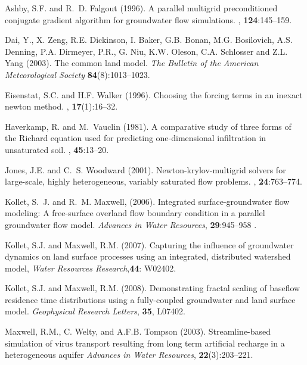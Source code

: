 \begin{thebibliography}{99}

Ashby, S.F. and R.~D. Falgout (1996).
\newblock A parallel multigrid preconditioned conjugate gradient algorithm for
  groundwater flow simulations.
, {\bf 124}:145--159.

Dai, Y., X. Zeng, R.E. Dickinson, I. Baker, G.B. Bonan, M.G. Bosilovich, A.S. Denning, P.A. Dirmeyer, P.R., G. Niu, K.W. Oleson, C.A. Schlosser and Z.L. Yang (2003). The common land model. {\em The Bulletin of the American Meteorological Society} {\bf 84}(8):1013--1023.

Eisenstat, S.C. and H.F. Walker (1996).
\newblock Choosing the forcing terms in an inexact newton method.
, {\bf 17}(1):16--32.

Haverkamp, R. and M.~Vauclin (1981).
\newblock A comparative study of three forms of the {R}ichard equation used for
  predicting one-dimensional infiltration in unsaturated soil.
, {\bf 45}:13--20.


Jones, J.E. and C.~S. Woodward (2001).
\newblock Newton-krylov-multigrid solvers for large-scale, highly heterogeneous, variably saturated flow problems.
, {\bf 24}:763--774.

Kollet, S.~J. and R.~M. Maxwell, (2006). Integrated
surface-groundwater flow
  modeling: A free-surface overland flow boundary condition in a parallel
  groundwater flow model. {\em Advances in Water Resources}, {\bf 29}:945--958 .

Kollet, S.J. and Maxwell, R.M. (2007). Capturing the influence of groundwater dynamics on land surface processes using an integrated, distributed watershed model, { \em Water Resources Research},{\bf 44}: W02402.

Kollet, S.J. and Maxwell, R.M. (2008). Demonstrating fractal scaling of baseflow residence time distributions using a fully-coupled groundwater and land surface model. {\em Geophysical Research Letters}, {\bf 35}, L07402. 

 Maxwell, R.M., C. Welty, and A.F.B. Tompson (2003).
Streamline-based simulation of virus transport resulting from long term
artificial recharge in a heterogeneous aquifer {\em Advances in Water
Resources}, {\bf 22}(3):203--221.


\end{thebibliography}
